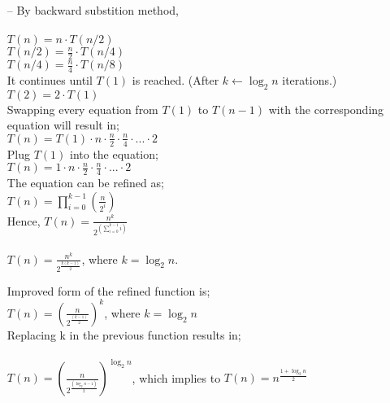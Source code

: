 \documentclass[12pt]{article}
\begin{document}
  \begin{itemize}
    \item[--] By backward substition method, \\\\
              $T(n) = n \cdot T(n/2)$ \\
              $T(n/2) = \frac{n}{2} \cdot T(n/4)$ \\
              $T(n/4) = \frac{n}{4} \cdot T(n/8)$ \\
              It continues until $T(1)$ is reached. (After $k \gets \log_{2}n$ iterations.) \\
              $T(2) = 2 \cdot T(1)$ \\

              Swapping every equation from $T(1)$ to $T(n-1)$ with the corresponding equation will result in; \\
              $T(n) = T(1) \cdot n \cdot \frac{n}{2} \cdot \frac{n}{4} \cdot ... \cdot 2$ \\

              Plug $T(1)$ into the equation; \\

              $T(n) = 1 \cdot n \cdot \frac{n}{2} \cdot \frac{n}{4} \cdot ... \cdot 2$ \\

              The equation can be refined as; \\
              $T(n) = \prod_{i=0}^{k-1}(\frac{n}{2^{i}})$ \\
              Hence, $T(n) = \frac{n^{k}}{2^{(\sum_{i=0}^{k-1}i)}}$ \\\\

              $T(n) = \frac{n^{k}}{2^{\frac{k(k-1)}{2}}}$, where $k = \log_{2}n$.

              Improved form of the refined function is; \\
              $T(n) = (\frac{n}{2^{\frac{(k-1)}{2}}})^{k}$, where $k=\log_{2}n$ \\
              Replacing k in the previous function results in; \\\\
              $T(n) = (\frac{n}{2^{\frac{(\log_{2}n-1)}{2}}})^{\log_{2}n}$, which implies to $T(n) = n^{\frac{1+\log_{2}n}{2}}$

  \end{itemize}
\end{document}
